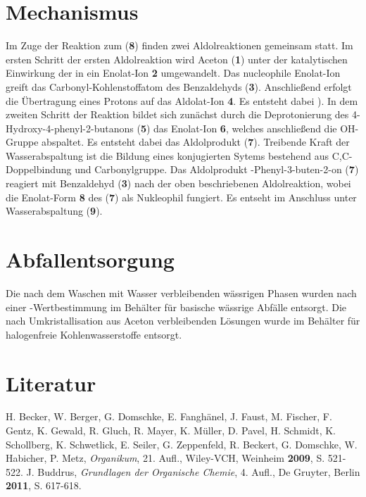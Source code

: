 \documentclass[12pt]{article}
\begin{document}
\begin{onehalfspace}
\section{Mechanismus\cite{bio}}
Im Zuge der Reaktion zum  (\textbf{8}) finden zwei Aldolreaktionen gemeinsam statt. Im ersten Schritt der ersten Aldolreaktion wird Aceton (\textbf{1}) unter der katalytischen Einwirkung der \fmch{} in ein Enolat-Ion \textbf{2} umgewandelt. Das nucleophile Enolat-Ion greift das Carbonyl-Kohlenstoffatom des Benzaldehyds (\textbf{3}). Anschließend erfolgt die Übertragung eines Protons auf das Aldolat-Ion \textbf{4}. Es entsteht dabei ). In dem zweiten Schritt der Reaktion bildet sich zunächst durch die Deprotonierung des 4-Hydroxy-4-phenyl-2-butanons (\textbf{5}) das Enolat-Ion \textbf{6}, welches anschließend die OH-Gruppe abspaltet. Es entsteht dabei das Aldolprodukt  (\textbf{7}). Treibende Kraft der Wasserabspaltung ist die Bildung eines konjugierten Sytems bestehend aus C,C-Doppelbindung und Carbonylgruppe. Das Aldolprodukt -Phenyl-3-buten-2-on (\textbf{7}) reagiert mit Benzaldehyd (\textbf{3}) nach der oben beschriebenen Aldolreaktion, wobei die Enolat-Form \textbf{8} des  (\textbf{7}) als Nukleophil fungiert. Es entseht im Anschluss  unter Wasserabspaltung  (\textbf{9}).
\section{Abfallentsorgung}
Die nach dem Waschen mit Wasser verbleibenden wässrigen Phasen wurden nach einer \pH-Wertbestimmung im Behälter für basische wässrige Abfälle entsorgt. Die nach Umkristallisation aus Aceton verbleibenden Lösungen wurde im Behälter für halogenfreie Kohlenwasserstoffe entsorgt.
\section{Literatur}
\renewcommand{\section}[2]{}%
\begin{thebibliography}{}
H. Becker, W. Berger, G. Domschke, E. Fanghänel, J. Faust, M. Fischer, F. Gentz, K. Gewald, R. Gluch, R. Mayer, K. Müller, D. Pavel, H. Schmidt, K. Schollberg, K. Schwetlick, E. Seiler, G. Zeppenfeld, R. Beckert, G. Domschke, W. Habicher, P. Metz, \textit{Organikum}, 21. Aufl., Wiley-VCH, Weinheim \textbf{2009}, S. 521-522. 
J. Buddrus, \textit{Grundlagen der Organische Chemie}, 4. Aufl., De Gruyter, Berlin \textbf{2011}, S. 617-618.
\end{thebibliography}
\end{onehalfspace}
\end{document}
